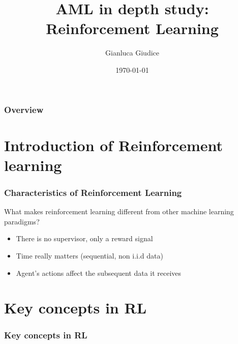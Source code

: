\documentclass[9pt]{beamer}
\title{AML in depth study: Reinforcement Learning}
\author{
 Gianluca Giudice
}
\institute[UNIMIB] %
{
University of Milano-Bicocca\\
\medskip
\textit{g.giudice2@campus.unimib.it}
}
\date{\today} %
\begin{document}
\begin{frame}
\titlepage %
\end{frame}

\begin{frame}
\frametitle{Overview} %
\tableofcontents %
\end{frame}

\section{Introduction of Reinforcement learning}

\begin{frame}
\frametitle{Characteristics of Reinforcement Learning}

What makes reinforcement learning different from other machine learning paradigms?
\begin{itemize}
\item There is no supervisor, only a reward signal
\item Time really matters (sequential, non i.i.d data)
\item Agent's actions affect the subsequent data it receives
\end{itemize}

\end{frame}

\section{Key concepts in RL}

\begin{frame}
\frametitle{Key concepts in RL}

\tableofcontents[ 
currentsubsection, 
hideothersubsections, 
sectionstyle=show/shaded,
]

\end{frame}

\end{document}
